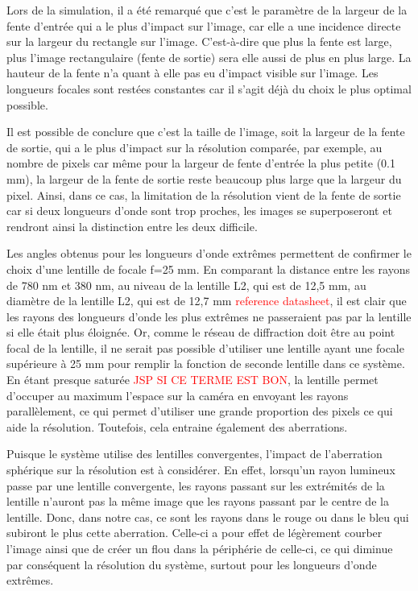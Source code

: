 \documentclass[conference]{IEEEtran}
\begin{document}
Lors de la simulation, il a été remarqué que c'est le paramètre de la largeur de la fente d'entrée qui a le plus d'impact sur l'image,
car elle a une incidence directe sur la largeur du rectangle sur l'image. C'est-à-dire que plus la fente est large, plus
l'image rectangulaire (fente de sortie) sera elle aussi de plus en plus large. La hauteur de la fente n'a quant à elle pas eu d'impact
visible sur l'image. Les longueurs focales sont restées constantes car il s'agit déjà du choix le plus optimal possible.

Il est possible de conclure que c'est la taille de l'image, soit la largeur de la fente de sortie, qui a le plus d'impact sur la résolution comparée, par exemple, au nombre de pixels
car même pour la largeur de fente d'entrée la plus petite (0.1 mm), la largeur de la fente de sortie reste beaucoup plus large que la largeur du pixel.
Ainsi, dans ce cas, la limitation de la résolution vient de la fente de sortie car si deux longueurs d'onde sont trop proches, les images se superposeront
et rendront ainsi la distinction entre les deux difficile.

Les angles obtenus pour les longueurs d'onde extrêmes permettent de confirmer le choix d'une lentille de focale f=25 mm. En 
comparant la distance entre les rayons de 780 nm et 380 nm, au niveau de la lentille L2, qui est de 12,5 mm, au diamètre de
la lentille L2, qui est de 12,7 mm \textcolor{red}{reference datasheet}, il est clair que les rayons des longueurs d'onde 
les plus extrêmes ne passeraient pas par la lentille si elle était plus éloignée. Or, comme le réseau de diffraction doit être
au point focal de la lentille, il ne serait pas possible d'utiliser une lentille ayant une focale supérieure à 25 mm pour 
remplir la fonction de seconde lentille dans ce système. En étant presque saturée \textcolor{red}{JSP SI CE TERME EST BON}, 
la lentille permet d'occuper au maximum l'espace sur la caméra en envoyant les rayons parallèlement, ce qui permet d'utiliser
une grande proportion des pixels ce qui aide la résolution. Toutefois, cela entraine également des aberrations.

Puisque le système utilise des lentilles convergentes, l'impact de l'aberration sphérique \cite{edmund_optics_aberrations} sur la résolution est à considérer.
En effet, lorsqu'un rayon lumineux passe par une lentille convergente, les rayons passant sur les extrémités de la lentille
n'auront pas la même image que les rayons passant par le centre de la lentille. Donc, dans notre cas, ce sont les
rayons dans le rouge ou dans le bleu qui subiront le plus cette aberration. Celle-ci a pour effet de légèrement courber l'image
ainsi que de créer un flou dans la périphérie de celle-ci, ce qui diminue par conséquent la résolution du système, surtout pour les longueurs d'onde
extrêmes. 
\end{document}
